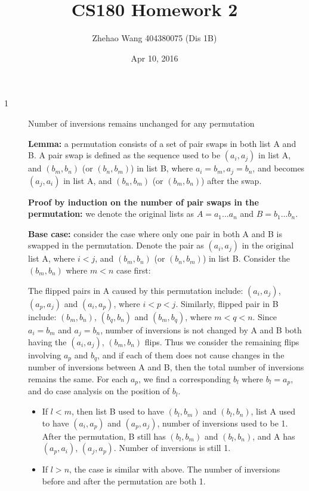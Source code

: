 \documentclass{article}
\title{CS180 Homework 2}
\author{Zhehao Wang 404380075 (Dis 1B)}
\date{Apr 10, 2016}
\begin{document}
\maketitle

\begin{description}

\item[1]{Number of inversions remains unchanged for any permutation}
  
  \textbf{Lemma:} a permutation consists of a set of pair swaps in both list A and B. A pair swap is defined as the sequence used to be $(a_i, a_j)$ in list A, and $(b_m, b_n)$ (or $(b_n, b_m)$) in list B, where $a_i = b_m, a_j = b_n$, and becomes $(a_j, a_i)$ in list A, and $(b_n, b_m)$ (or $(b_m, b_n)$) after the swap.
  
  \textbf{Proof by induction on the number of pair swaps in the permutation:} we denote the original lists as $A = {a_1...a_n}$ and $B = {b_1...b_n}$.

  \textbf{Base case:} consider the case where only one pair in both A and B is swapped in the permutation. Denote the pair as $(a_i, a_j)$ in the original list A, where $i < j$, and $(b_m, b_n)$ (or $(b_n, b_m)$) in list B. Consider the $(b_m, b_n)$ where $m < n$ case first:

  The flipped pairs in A caused by this permutation include: $(a_i, a_j)$, $(a_p, a_j)$ and $(a_i, a_p)$, where $i < p < j$. Similarly, flipped pair in B include: $(b_m, b_n)$, $(b_q, b_n)$ and $(b_m, b_q)$, where $m < q < n$. Since $a_i = b_m$ and $a_j = b_n$, number of inversions is not changed by A and B both having the $(a_i, a_j)$, $(b_m, b_n)$ flips. Thus we consider the remaining flips involving $a_p$ and $b_q$, and if each of them does not cause changes in the number of inversions between A and B, then the total number of inversions remains the same. For each $a_p$, we find a corresponding $b_l$ where $b_l = a_p$, and do case analysis on the position of $b_l$.
  
  \begin{itemize}
  \item
  If $l < m$, then list B used to have $(b_l, b_m)$ and $(b_l, b_n)$, list A used to have $(a_i, a_p)$ and $(a_p, a_j)$, number of inversions used to be 1. After the permutation, B still has $(b_l, b_m)$ and $(b_l, b_n)$, and A has $(a_p, a_i)$, $(a_j, a_p)$. Number of inversions is still 1.

  \item
  If $l > n$, the case is similar with above. The number of inversions before and after the permutation are both 1.


\end{itemize}
\end{description}
\end{document}
